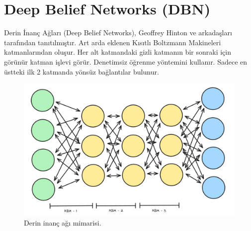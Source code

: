 \section{Deep Belief Networks (DBN)}
Derin İnanç Ağları (Deep Belief Networks), Geoffrey Hinton ve arkadaşları tarafından tanıtılmıştır. Art arda eklenen Kısıtlı Boltzmann Makineleri katmanlarından oluşur. Her alt katmandaki gizli katmanın bir sonraki için görünür katman işlevi görür. Denetimsiz öğrenme yöntemini kullanır. Sadece en üstteki ilk 2 katmanda yönsüz bağlantılar bulunur. 

\begin{figure}[h]
    \centering
    \includegraphics[width=1\textwidth]{images/deep_belief_networks.png}
    \caption{Derin inanç ağı mimarisi.}
    \label{fig:enter-label}
\end{figure}

\newpage